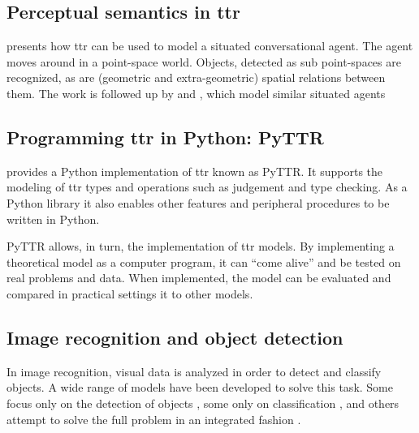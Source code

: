 



\subsection{Perceptual semantics in \acrfull{ttr}}


\cite{DobnikModellinglanguageaction2012} presents how \gls{ttr} can be used to model a situated conversational agent.
The agent moves around in a point-space world.
Objects, detected as sub point-spaces are recognized, as are (geometric and extra-geometric) spatial relations between them.
The work is followed up by \cite{ttrspat} and \cite{lspc}, which model similar situated agents




\subsection{Programming \acrshort{ttr} in Python: PyTTR}

\cite{pyttr} provides a Python implementation of \gls{ttr} known as PyTTR.
It supports the modeling of \gls{ttr} types and operations such as judgement and type checking.
As a Python library it also enables other features and peripheral procedures to be written in Python.

PyTTR allows, in turn, the implementation of \gls{ttr} models.
By implementing a theoretical model as a computer program, it can ``come alive'' and be tested on real problems and data.
When implemented, the model can be evaluated and compared in practical settings it to other models.




\subsection{Image recognition and object detection}

In image recognition, visual data is analyzed in order to detect and classify objects.
A wide range of models have been developed to solve this task.
Some focus only on the detection of objects \citep{BlaschkoLearningLocalizeObjects2008}, some only on classification \citep[ResNet,][]{HeDeepResidualLearning2015}, and others attempt to solve the full problem in an integrated fashion \citep{RedmonYouOnlyLook2015,HeMaskRCNN2017}.

